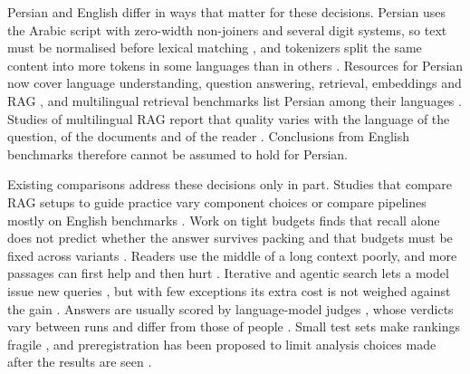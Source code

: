 Persian and English differ in ways that matter for these decisions. Persian uses the Arabic script with zero-width non-joiners and several digit systems, so text must be normalised before lexical matching \citep{mohtaj2018parsivar}, and tokenizers split the same content into more tokens in some languages than in others \citep{petrov2023tokenizers,ahia2023cost}. Resources for Persian now cover language understanding, question answering, retrieval, embeddings and RAG \citep{khashabi2021parsinlu,darvishi2023pquad,zinvandi2025famteb,hosseinbeigi2025persianrag}, and multilingual retrieval benchmarks list Persian among their languages \citep{zhang2023miracl}. Studies of multilingual RAG report that quality varies with the language of the question, of the documents and of the reader \citep{chirkova2024mrag,wu2024multilingual,amiraz2025crosslingual}. Conclusions from English benchmarks therefore cannot be assumed to hold for Persian.

Existing comparisons address these decisions only in part. Studies that compare RAG setups to guide practice vary component choices or compare pipelines mostly on English benchmarks \citep{wang2024bestpractices,rau2024bergen,li2024selfroute,ferrazzi2026agentic}. Work on tight budgets finds that recall alone does not predict whether the answer survives packing \citep{bala2026recall} and that budgets must be fixed across variants \citep{chacon2026fixedbudget}. Readers use the middle of a long context poorly, and more passages can first help and then hurt \citep{liu2024lost,levy2025moredocs}. Iterative and agentic search lets a model issue new queries \citep{yao2023react,jin2025searchr1}, but with few exceptions its extra cost is not weighed against the gain \citep{ferrazzi2026agentic,sharify2026rerank}. Answers are usually scored by language-model judges \citep{zheng2023judge}, whose verdicts vary between runs and differ from those of people \citep{haldar2025roulette,thakur2025judging}. Small test sets make rankings fragile \citep{card2020power,sakai2016topicset}, and preregistration has been proposed to limit analysis choices made after the results are seen \citep{vanmiltenburg2021prereg}.

